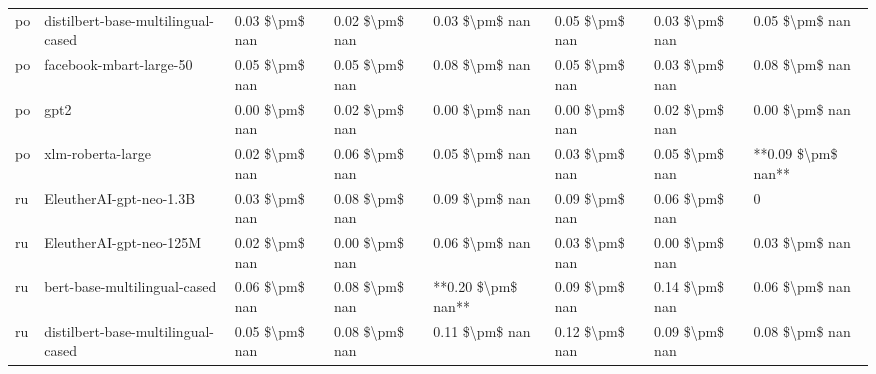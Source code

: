 \begin{tabular}{llllllll}
      po & distilbert-base-multilingual-cased & 0.03 \$\textbackslash pm\$ nan &            0.02 \$\textbackslash pm\$ nan &        0.03 \$\textbackslash pm\$ nan &         0.05 \$\textbackslash pm\$ nan &                          0.03 \$\textbackslash pm\$ nan &     0.05 \$\textbackslash pm\$ nan \\
      po &            facebook-mbart-large-50 & 0.05 \$\textbackslash pm\$ nan &            0.05 \$\textbackslash pm\$ nan &        0.08 \$\textbackslash pm\$ nan &         0.05 \$\textbackslash pm\$ nan &                          0.03 \$\textbackslash pm\$ nan &     0.08 \$\textbackslash pm\$ nan \\
      po &                               gpt2 & 0.00 \$\textbackslash pm\$ nan &            0.02 \$\textbackslash pm\$ nan &        0.00 \$\textbackslash pm\$ nan &         0.00 \$\textbackslash pm\$ nan &                          0.02 \$\textbackslash pm\$ nan &     0.00 \$\textbackslash pm\$ nan \\
      po &                  xlm-roberta-large & 0.02 \$\textbackslash pm\$ nan &            0.06 \$\textbackslash pm\$ nan &        0.05 \$\textbackslash pm\$ nan &         0.03 \$\textbackslash pm\$ nan &                          0.05 \$\textbackslash pm\$ nan & **0.09 \$\textbackslash pm\$ nan** \\
      ru &            EleutherAI-gpt-neo-1.3B & 0.03 \$\textbackslash pm\$ nan &            0.08 \$\textbackslash pm\$ nan &        0.09 \$\textbackslash pm\$ nan &         0.09 \$\textbackslash pm\$ nan &                          0.06 \$\textbackslash pm\$ nan &                  0 \\
      ru &            EleutherAI-gpt-neo-125M & 0.02 \$\textbackslash pm\$ nan &            0.00 \$\textbackslash pm\$ nan &        0.06 \$\textbackslash pm\$ nan &         0.03 \$\textbackslash pm\$ nan &                          0.00 \$\textbackslash pm\$ nan &     0.03 \$\textbackslash pm\$ nan \\
      ru &       bert-base-multilingual-cased & 0.06 \$\textbackslash pm\$ nan &            0.08 \$\textbackslash pm\$ nan &    **0.20 \$\textbackslash pm\$ nan** &         0.09 \$\textbackslash pm\$ nan &                          0.14 \$\textbackslash pm\$ nan &     0.06 \$\textbackslash pm\$ nan \\
      ru & distilbert-base-multilingual-cased & 0.05 \$\textbackslash pm\$ nan &            0.08 \$\textbackslash pm\$ nan &        0.11 \$\textbackslash pm\$ nan &         0.12 \$\textbackslash pm\$ nan &                          0.09 \$\textbackslash pm\$ nan &     0.08 \$\textbackslash pm\$ nan \\

\end{tabular}
